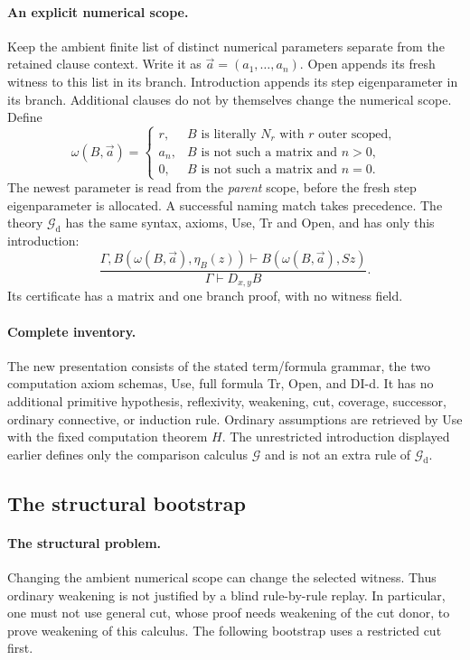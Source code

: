 \documentclass[11pt,letterpaper]{article}
\theoremstyle{definition}\newtheorem{definition}[theorem]{Definition}
\theoremstyle{remark}\newtheorem{remark}[theorem]{Remark}
\begin{document}
\paragraph{An explicit numerical scope.}
Keep the ambient finite list of distinct numerical parameters separate from
the retained clause context. Write it as $\vec a=(a_1,\ldots,a_n)$.
Open appends its fresh witness to this list in its branch. Introduction appends
its step eigenparameter in its branch. Additional clauses do not by themselves
change the numerical scope. Define
\[
 \omega(B,\vec a)=
 \begin{cases}
 r,&B\text{ is literally }N_r\text{ with }r\text{ outer scoped},\\
 a_n,&B\text{ is not such a matrix and }n>0,\\
 0,&B\text{ is not such a matrix and }n=0.
 \end{cases}                                             \tag{DW}
\]
The newest parameter is read from the \emph{parent} scope, before the fresh
step eigenparameter is allocated. A successful naming match takes precedence.
The theory $\mathcal G_{\mathrm d}$ has the same syntax, axioms, Use, Tr and
Open, and has only this introduction:
\[
 \frac{\Gamma,B(\omega(B,\vec a),\eta_B(z))
              \vdash B(\omega(B,\vec a),Sz)}
      {\Gamma\vdash D_{x,y}B}.                           \tag{DI-d}
\]
Its certificate has a matrix and one branch proof, with no witness field.


\paragraph{Complete inventory.}
The new presentation consists of the stated term/formula grammar, the two
computation axiom schemas, Use, full formula Tr, Open, and DI-d. It has no
additional primitive hypothesis, reflexivity, weakening, cut, coverage,
successor, ordinary connective, or induction rule. Ordinary assumptions are
retrieved by Use with the fixed computation theorem $H$. The unrestricted
introduction displayed earlier defines only the comparison calculus
$\mathcal G$ and is not an extra rule of $\mathcal G_{\mathrm d}$.

\subsection{The structural bootstrap}

\paragraph{The structural problem.}
Changing the ambient numerical scope can change the selected witness. Thus
ordinary weakening is not justified by a blind rule-by-rule replay. In
particular, one must not use general cut, whose proof needs weakening of the
cut donor, to prove weakening of this calculus. The following bootstrap uses
a restricted cut first.
\end{document}
